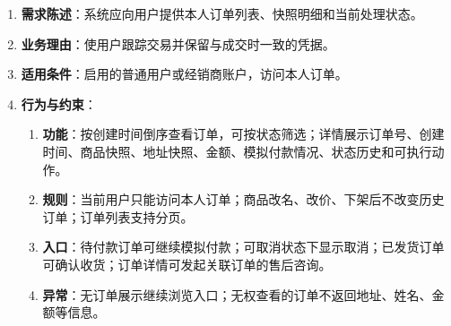 \begin{enumerate}
\item {\bfseries 需求陈述}：系统应向用户提供本人订单列表、快照明细和当前处理状态。
\item {\bfseries 业务理由}：使用户跟踪交易并保留与成交时一致的凭据。
\item {\bfseries 适用条件}：启用的普通用户或经销商账户，访问本人订单。
\item {\bfseries 行为与约束}：
\begin{enumerate}
\item {\bfseries 功能}：按创建时间倒序查看订单，可按状态筛选；详情展示订单号、创建时间、商品快照、地址快照、金额、模拟付款情况、状态历史和可执行动作。
\item {\bfseries 规则}：当前用户只能访问本人订单；商品改名、改价、下架后不改变历史订单；订单列表支持分页。
\item {\bfseries 入口}：待付款订单可继续模拟付款；可取消状态下显示取消；已发货订单可确认收货；订单详情可发起关联订单的售后咨询。
\item {\bfseries 异常}：无订单展示继续浏览入口；无权查看的订单不返回地址、姓名、金额等信息。
\end{enumerate}

\end{enumerate}


